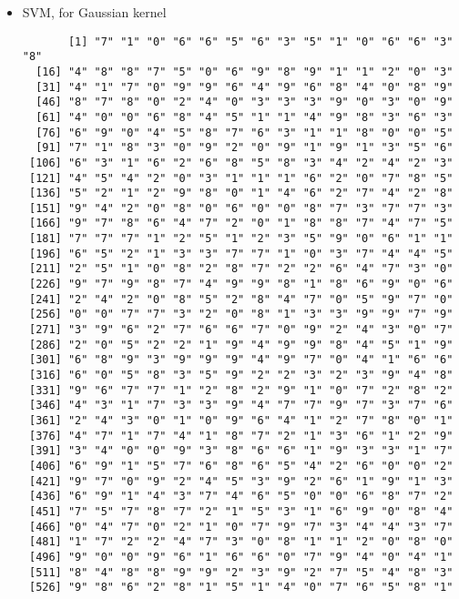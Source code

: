 \documentclass{article}
\begin{document}
\begin{itemize}
	\item SVM, for Gaussian kernel \\
	\begin{scriptsize}
	\begin{verbatim}
	   [1] "7" "1" "0" "6" "6" "5" "6" "3" "5" "1" "0" "6" "6" "3" "8"
  [16] "4" "8" "8" "7" "5" "0" "6" "9" "8" "9" "1" "1" "2" "0" "3"
  [31] "4" "1" "7" "0" "9" "9" "6" "4" "9" "6" "8" "4" "0" "8" "9"
  [46] "8" "7" "8" "0" "2" "4" "0" "3" "3" "3" "9" "0" "3" "0" "9"
  [61] "4" "0" "0" "6" "8" "4" "5" "1" "1" "4" "9" "8" "3" "6" "3"
  [76] "6" "9" "0" "4" "5" "8" "7" "6" "3" "1" "1" "8" "0" "0" "5"
  [91] "7" "1" "8" "3" "0" "9" "2" "0" "9" "1" "9" "1" "3" "5" "6"
 [106] "6" "3" "1" "6" "2" "6" "8" "5" "8" "3" "4" "2" "4" "2" "3"
 [121] "4" "5" "4" "2" "0" "3" "1" "1" "1" "6" "2" "0" "7" "8" "5"
 [136] "5" "2" "1" "2" "9" "8" "0" "1" "4" "6" "2" "7" "4" "2" "8"
 [151] "9" "4" "2" "0" "8" "0" "6" "0" "0" "8" "7" "3" "7" "7" "3"
 [166] "9" "7" "8" "6" "4" "7" "2" "0" "1" "8" "8" "7" "4" "7" "5"
 [181] "7" "7" "7" "1" "2" "5" "1" "2" "3" "5" "9" "0" "6" "1" "1"
 [196] "6" "5" "2" "1" "3" "3" "7" "7" "1" "0" "3" "7" "4" "4" "5"
 [211] "2" "5" "1" "0" "8" "2" "8" "7" "2" "2" "6" "4" "7" "3" "0"
 [226] "9" "7" "9" "8" "7" "4" "9" "9" "8" "1" "8" "6" "9" "0" "6"
 [241] "2" "4" "2" "0" "8" "5" "2" "8" "4" "7" "0" "5" "9" "7" "0"
 [256] "0" "0" "7" "7" "3" "2" "0" "8" "1" "3" "3" "9" "9" "7" "9"
 [271] "3" "9" "6" "2" "7" "6" "6" "7" "0" "9" "2" "4" "3" "0" "7"
 [286] "2" "0" "5" "2" "2" "1" "9" "4" "9" "9" "8" "4" "5" "1" "9"
 [301] "6" "8" "9" "3" "9" "9" "9" "4" "9" "7" "0" "4" "1" "6" "6"
 [316] "6" "0" "5" "8" "3" "5" "9" "2" "2" "3" "2" "3" "9" "4" "8"
 [331] "9" "6" "7" "7" "1" "2" "8" "2" "9" "1" "0" "7" "2" "8" "2"
 [346] "4" "3" "1" "7" "3" "3" "9" "4" "7" "7" "9" "7" "3" "7" "6"
 [361] "2" "4" "3" "0" "1" "0" "9" "6" "4" "1" "2" "7" "8" "0" "1"
 [376] "4" "7" "1" "7" "4" "1" "8" "7" "2" "1" "3" "6" "1" "2" "9"
 [391] "3" "4" "0" "0" "9" "3" "8" "6" "6" "1" "9" "3" "3" "1" "7"
 [406] "6" "9" "1" "5" "7" "6" "8" "6" "5" "4" "2" "6" "0" "0" "2"
 [421] "9" "7" "0" "9" "2" "4" "5" "3" "9" "2" "6" "1" "9" "1" "3"
 [436] "6" "9" "1" "4" "3" "7" "4" "6" "5" "0" "0" "6" "8" "7" "2"
 [451] "7" "5" "7" "8" "7" "2" "1" "5" "3" "1" "6" "9" "0" "8" "4"
 [466] "0" "4" "7" "0" "2" "1" "0" "7" "9" "7" "3" "4" "4" "3" "7"
 [481] "1" "7" "2" "2" "4" "7" "3" "0" "8" "1" "1" "2" "0" "8" "0"
 [496] "9" "0" "0" "9" "6" "1" "6" "6" "0" "7" "9" "4" "0" "4" "1"
 [511] "8" "4" "8" "8" "9" "9" "2" "3" "9" "2" "7" "5" "4" "8" "3"
 [526] "9" "8" "6" "2" "8" "1" "5" "1" "4" "0" "7" "6" "5" "8" "1"

\end{verbatim}
\end{scriptsize}
\end{itemize}
\end{document}
